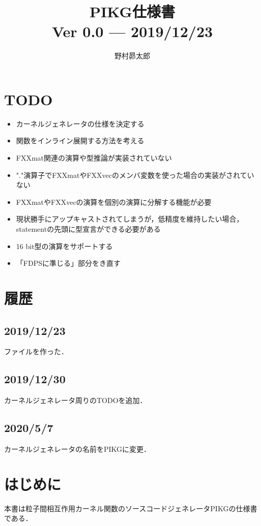 \documentclass{article}
\begin{document}
%
\title{PIKG仕様書\\
{\large 
Ver 0.0 --- 2019/12/23\\
}
}
\author{野村昴太郎}
\maketitle
\thispagestyle{empty}

\newpage
\tableofcontents
\newpage

\section{TODO}
 \begin{itemize}
  \item カーネルジェネレータの仕様を決定する
  \item 関数をインライン展開する方法を考える
  \item FXXmat関連の演算や型推論が実装されていない
  \item "."演算子でFXXmatやFXXvecのメンバ変数を使った場合の実装がされていない
  \item FXXmatやFXXvecの演算を個別の演算に分解する機能が必要
  \item 現状勝手にアップキャストされてしまうが，低精度を維持したい場合，statementの先頭に型宣言ができる必要がある
  \item 16 bit型の演算をサポートする
  \item 「FDPSに準じる」部分をき直す
 \end{itemize}
\section{履歴}
\label{sect:4}
\subsection{2019/12/23}
ファイルを作った．
\subsection{2019/12/30}
カーネルジェネレータ周りのTODOを追加．
\subsection{2020/5/7}
カーネルジェネレータの名前をPIKGに変更．

\section{はじめに}
本書は粒子間相互作用カーネル関数のソースコードジェネレータPIKGの仕様書である．
\end{document}

